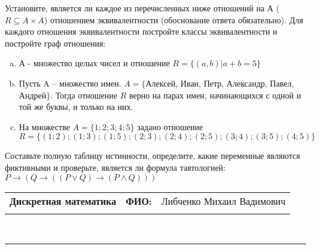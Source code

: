 \documentclass[10pt]{exam}
\newcommand{\class}{Дискретная математика}
\newcommand{\examdate}{}
\begin{document}
\begin{questions}
\question
Установите, является ли каждое из перечисленных ниже отношений на А ($R \subseteq A \times A$) отношением эквивалентности (обоснование ответа обязательно). Для каждого отношения эквивалентности постройте классы 
эквивалентности и постройте граф отношения:
\begin{enumerate} [a)]\setcounter{enumi}{0}
\item А - множество целых чисел и отношение $R = \{(a,b)|a + b = 5\}$
\item Пусть A – множество имен. $A = \{ $Алексей, Иван, Петр, Александр, Павел, Андрей$ \}$. Тогда отношение $R $ верно на парах имен, начинающихся с одной и той же буквы, и только на них.
\item На множестве $A = \{1; 2; 3; 4; 5\}$ задано отношение $R = \{(1; 2); (1; 3); (1; 5); (2; 3); (2; 4); (2; 5); (3; 4); (3; 5); (4; 5)\}$
\end{enumerate}\question Составьте полную таблицу истинности, определите, какие переменные являются фиктивными и проверьте, является ли формула тавтологией:
$ P \rightarrow (Q \rightarrow ((P \lor Q) \rightarrow (P \land Q)))$

\end{questions}
\newpage
\begin{flushright}
\begin{tabular}{p{2.8in} r l}
\textbf{\class} & \textbf{ФИО:} &Либченко Михаил Вадимович
\\

\textbf{\examdate} &&\\
\end{tabular}\\
\end{flushright}
\rule[1ex]{\textwidth}{.1pt}
\end{document}
